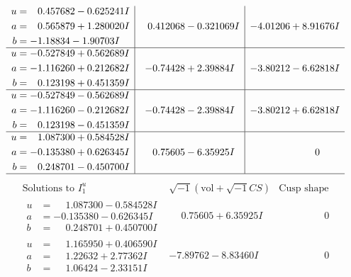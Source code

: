 \documentclass[1p]{elsarticle_modified}
\theoremstyle{definition}
\newcommand{\I}{\sqrt{-1}}
\begin{document}
$$\begin{array}{c|c|c}
\begin{aligned}
u &= \phantom{-}0.457682 - 0.625241 I \\
a &= \phantom{-}0.565879 + 1.280020 I \\
b &= -1.18834 - 1.90703 I\end{aligned}
 & \phantom{-}0.412068 - 0.321069 I & -4.01206 + 8.91676 I \\ \hline\begin{aligned}
u &= -0.527849 + 0.562689 I \\
a &= -1.116260 + 0.212682 I \\
b &= \phantom{-}0.123198 + 0.451359 I\end{aligned}
 & -0.74428 + 2.39884 I & -3.80212 - 6.62818 I \\ \hline\begin{aligned}
u &= -0.527849 - 0.562689 I \\
a &= -1.116260 - 0.212682 I \\
b &= \phantom{-}0.123198 - 0.451359 I\end{aligned}
 & -0.74428 - 2.39884 I & -3.80212 + 6.62818 I \\ \hline\begin{aligned}
u &= \phantom{-}1.087300 + 0.584528 I \\
a &= -0.135380 + 0.626345 I \\
b &= \phantom{-}0.248701 - 0.450700 I\end{aligned}
 & \phantom{-}0.75605 - 6.35925 I & \phantom{-0.000000 } 0\\
 \hline 
 \end{array}$$\newpage$$\begin{array}{c|c|c}  
\text{Solutions to }I^u_{1}& \I (\text{vol} + \sqrt{-1}CS) & \text{Cusp shape}\\
 \hline 
\begin{aligned}
u &= \phantom{-}1.087300 - 0.584528 I \\
a &= -0.135380 - 0.626345 I \\
b &= \phantom{-}0.248701 + 0.450700 I\end{aligned}
 & \phantom{-}0.75605 + 6.35925 I & \phantom{-0.000000 } 0 \\ \hline\begin{aligned}
u &= \phantom{-}1.165950 + 0.406590 I \\
a &= \phantom{-}1.22632 + 2.77362 I \\
b &= \phantom{-}1.06424 - 2.33151 I\end{aligned}
 & -7.89762 - 8.83460 I & \phantom{-0.000000 } 0 \\ \hline\begin{aligned}

\end{aligned}
\end{array}$$
\end{document}
